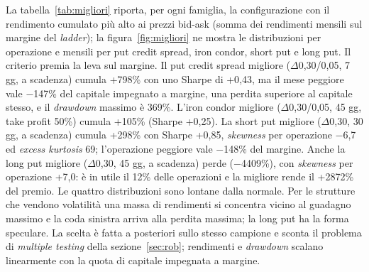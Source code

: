 \documentclass[11pt,a4paper]{article}
\begin{document}
La tabella~\ref{tab:migliori} riporta, per ogni famiglia, la configurazione con il rendimento cumulato più alto ai prezzi bid-ask (somma dei rendimenti mensili sul margine del \emph{ladder}); la figura~\ref{fig:migliori} ne mostra le distribuzioni per operazione e mensili per put credit spread, iron condor, short put e long put. Il criterio premia la leva sul margine. Il put credit spread migliore ($\Delta$0{,}30/0{,}05, 7 gg, a scadenza) cumula +798\% con uno Sharpe di +0{,}43, ma il mese peggiore vale $-$147\% del capitale impegnato a margine, una perdita superiore al capitale stesso, e il \emph{drawdown} massimo è 369\%. L'iron condor migliore ($\Delta$0{,}30/0{,}05, 45 gg, take profit 50\%) cumula +105\% (Sharpe +0{,}25). La short put migliore ($\Delta$0{,}30, 30 gg, a scadenza) cumula +298\% con Sharpe +0{,}85, \emph{skewness} per operazione $-$6{,}7 ed \emph{excess kurtosis} 69; l'operazione peggiore vale $-$148\% del margine. Anche la long put migliore ($\Delta$0{,}30, 45 gg, a scadenza) perde ($-$4409\%), con \emph{skewness} per operazione +7{,}0: è in utile il 12\% delle operazioni e la migliore rende il +2872\% del premio. Le quattro distribuzioni sono lontane dalla normale. Per le strutture che vendono volatilità una massa di rendimenti si concentra vicino al guadagno massimo e la coda sinistra arriva alla perdita massima; la long put ha la forma speculare. La scelta è fatta a posteriori sullo stesso campione e sconta il problema di \emph{multiple testing} della sezione~\ref{sec:rob}; rendimenti e \emph{drawdown} scalano linearmente con la quota di capitale impegnata a margine.
\end{document}
